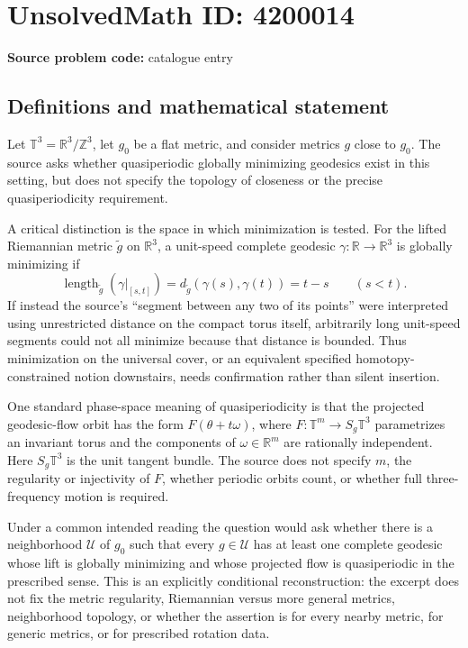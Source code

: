 \documentclass[11pt]{article}
\begin{document}
\section*{UnsolvedMath ID: 4200014}
\textbf{Source problem code:} catalogue entry
\subsection{Definitions and mathematical statement}
Let \(\mathbb T^3=\mathbb R^3/\mathbb Z^3\), let \(g_0\) be a flat metric, and consider metrics \(g\) close to \(g_0\). The source asks whether quasiperiodic globally minimizing geodesics exist in this setting, but does not specify the topology of closeness or the precise quasiperiodicity requirement.

A critical distinction is the space in which minimization is tested. For the lifted Riemannian metric \(\widetilde g\) on \(\mathbb R^3\), a unit-speed complete geodesic \(\gamma:\mathbb R\to\mathbb R^3\) is globally minimizing if
\[
 \operatorname{length}_{\widetilde g}(\gamma|_{[s,t]})
 =d_{\widetilde g}(\gamma(s),\gamma(t))=t-s
 \qquad(s<t).
\]
If instead the source's ``segment between any two of its points'' were interpreted using unrestricted distance on the compact torus itself, arbitrarily long unit-speed segments could not all minimize because that distance is bounded. Thus minimization on the universal cover, or an equivalent specified homotopy-constrained notion downstairs, needs confirmation rather than silent insertion.

One standard phase-space meaning of quasiperiodicity is that the projected geodesic-flow orbit has the form \(F(\theta+t\omega)\), where \(F:\mathbb T^m\to S_g\mathbb T^3\) parametrizes an invariant torus and the components of \(\omega\in\mathbb R^m\) are rationally independent. Here \(S_g\mathbb T^3\) is the unit tangent bundle. The source does not specify \(m\), the regularity or injectivity of \(F\), whether periodic orbits count, or whether full three-frequency motion is required.

Under a common intended reading the question would ask whether there is a neighborhood \(\mathcal U\) of \(g_0\) such that every \(g\in\mathcal U\) has at least one complete geodesic whose lift is globally minimizing and whose projected flow is quasiperiodic in the prescribed sense. This is an explicitly conditional reconstruction: the excerpt does not fix the metric regularity, Riemannian versus more general metrics, neighborhood topology, or whether the assertion is for every nearby metric, for generic metrics, or for prescribed rotation data.
\end{document}

